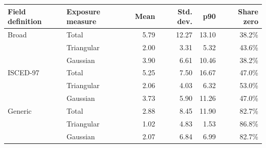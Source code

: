 \begin{tabular}{llrrrr}
\toprule
Field definition & Exposure measure & Mean & Std. dev. & p90 & Share zero \\
\midrule
Broad & Total &   5.79 &  12.27 &  13.10 &  38.2\% \\
 & Triangular &   2.00 &   3.31 &   5.32 &  43.6\% \\
 & Gaussian &   3.90 &   6.61 &  10.46 &  38.2\% \\
\addlinespace
ISCED-97 & Total &   5.25 &   7.50 &  16.67 &  47.0\% \\
 & Triangular &   2.06 &   4.03 &   6.32 &  53.0\% \\
 & Gaussian &   3.73 &   5.90 &  11.26 &  47.0\% \\
\addlinespace
Generic & Total &   2.88 &   8.45 &  11.90 &  82.7\% \\
 & Triangular &   1.02 &   4.83 &   1.53 &  86.8\% \\
 & Gaussian &   2.07 &   6.84 &   6.99 &  82.7\% \\
\bottomrule
\end{tabular}
